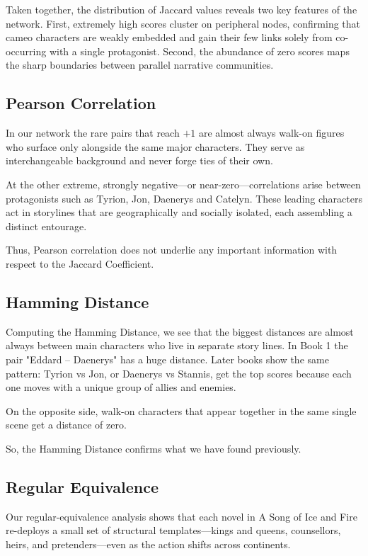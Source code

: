 \documentclass[12pt, a4paper]{article}
\begin{document}
Taken together, the distribution of Jaccard values reveals two key features
of the network.  First, extremely high scores cluster on peripheral nodes,
confirming that cameo characters are weakly embedded and gain their few links
solely from co-occurring with a single protagonist.  Second, the abundance of
zero scores maps the sharp boundaries between parallel narrative communities.

\subsection*{Pearson Correlation}

In our network the rare pairs that reach \(+1\) are almost always
walk-on figures who surface only alongside the same major characters.  
They serve as interchangeable background and never forge ties of their own.

At the other extreme, strongly negative—or near-zero—correlations arise
between protagonists such as Tyrion, Jon, Daenerys and Catelyn.
These leading characters act in storylines that are geographically and
socially isolated, each assembling a distinct entourage.

Thus, Pearson correlation does not underlie any important information with respect to the Jaccard Coefficient.

\subsection*{Hamming Distance}

Computing the Hamming Distance, we see that the biggest distances are almost always between main characters who live in separate story lines.
In Book 1 the pair "Eddard – Daenerys" has a huge distance.
Later books show the same pattern: Tyrion vs Jon, or Daenerys vs Stannis, get the top scores because each one moves with a unique group of allies and enemies.

On the opposite side, walk-on characters that appear together in the same single scene get a distance of zero.


So, the Hamming Distance confirms what we have found previously.

 
\subsection*{Regular Equivalence}

Our regular-equivalence analysis shows that each novel in A Song of Ice and Fire re-deploys a small set of structural templates—kings and queens, counsellors, heirs, and pretenders—even as the action shifts across continents.
\end{document}
